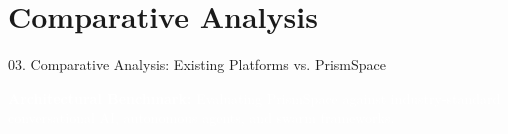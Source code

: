 \documentclass[aspectratio=169,10pt]{beamer}
\begin{document}
\section{Comparative Analysis}

\begin{frame}[t]{03. Comparative Analysis: Existing Platforms vs. PrismSpace}
\vspace{-0.44em}

\centering
\begin{tcolorbox}[
  enhanced, colback=lavenderDark!90, colframe=lavenderDark, arc=3pt,
  boxrule=0.5pt, width=0.98\linewidth, top=1.4pt, bottom=1.4pt, left=8pt, right=8pt,
  halign=center
]
  \textcolor{white}{\fontsize{6.6}{8.0}\selectfont\sffamily
  \textbf{Architectural Benchmark:} Evaluating PrismSpace against industry-standard conversational AI, autonomous agents, and swarm frameworks.}
\end{tcolorbox}

\vspace{-0.46em}


\end{frame}
\end{document}
